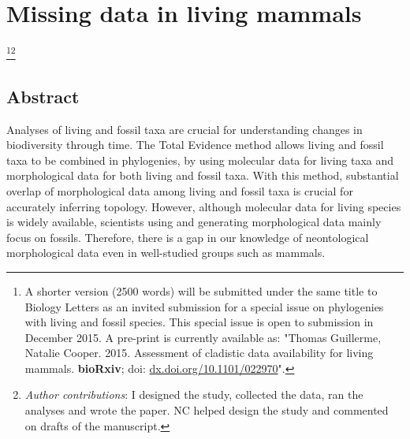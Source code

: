 

%
%

\chapter[Missing data in living mammals]{Missing data in living mammals}
\label{chap:missing_mammals}

\bigskip
\medskip
\begin{center}

\footnote{A shorter version (2500 words) will be submitted under the same title to Biology Letters as an invited submission for a special issue on phylogenies with living and fossil species. This special issue is open to submission in December 2015. A pre-print is currently available as:
"Thomas Guillerme, Natalie Cooper. 2015. Assessment of cladistic data availability for living mammals. \textbf{bioRxiv}; doi: \href{http://dx.doi.org/10.1101/022970}{dx.doi.org/10.1101/022970}".}\footnote{\textit{Author contributions}: I designed the study, collected the data, ran the analyses and wrote the paper. NC helped design the study and commented on drafts of the manuscript.} \\


\end{center}
%
%


\section*{Abstract}
Analyses of living and fossil taxa are crucial for understanding changes in biodiversity through time.
The Total Evidence method allows living and fossil taxa to be combined in phylogenies, by using molecular data for living taxa and morphological data for both living and fossil taxa.
With this method, substantial overlap of morphological data among living and fossil taxa is crucial for accurately inferring topology.
However, although molecular data for living species is widely available, scientists using and generating morphological data mainly focus on fossils.
Therefore, there is a gap in our knowledge of neontological morphological data even in well-studied groups such as mammals.

